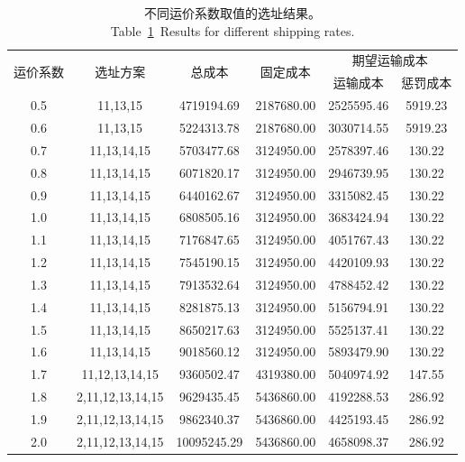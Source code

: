 \begin{table}[htbp]
    \setlength{\abovecaptionskip}{-0.05cm} %
    \setlength{\belowcaptionskip}{-0.2cm} 
    \centering
    \renewcommand\arraystretch{0.9}
    \caption{不同运价系数取值的选址结果。
    \\Table~\ref{table:sens_price}~Results for different shipping rates.}
    \small{
        \begin{tabular}{cccccc}
            \toprule %
            \multirow{2}[0]{*}{运价系数} & \multirow{2}[0]{*}{选址方案} & \multirow{2}[0]{*}{总成本} & \multirow{2}[0]{*}{固定成本} & \multicolumn{2}{c}{期望运输成本} \\
            \cmidrule{5-6}
                &       &       &       & 运输成本  & 惩罚成本 \\
            \midrule
            0.5   &  11,13,15 & 4719194.69 & 2187680.00 & 2525595.46  & 5919.23  \\
            0.6   &  11,13,15 & 5224313.78 & 2187680.00 & 3030714.55  & 5919.23  \\
            0.7   &  11,13,14,15 & 5703477.68 & 3124950.00 & 2578397.46  & 130.22  \\
            0.8   &  11,13,14,15 & 6071820.17 & 3124950.00 & 2946739.95  & 130.22  \\
            0.9   &  11,13,14,15 & 6440162.67 & 3124950.00 & 3315082.45  & 130.22  \\
            1.0   &  11,13,14,15 & 6808505.16 & 3124950.00 & 3683424.94  & 130.22  \\
            1.1   &  11,13,14,15 & 7176847.65 & 3124950.00 & 4051767.43  & 130.22  \\
            1.2   &  11,13,14,15 & 7545190.15 & 3124950.00 & 4420109.93  & 130.22  \\
            1.3   &  11,13,14,15 & 7913532.64 & 3124950.00 & 4788452.42  & 130.22  \\
            1.4   &  11,13,14,15 & 8281875.13 & 3124950.00 & 5156794.91  & 130.22  \\
            1.5   &  11,13,14,15 & 8650217.63 & 3124950.00 & 5525137.41  & 130.22  \\
            1.6   &  11,13,14,15 & 9018560.12 & 3124950.00 & 5893479.90  & 130.22  \\
            1.7   &  11,12,13,14,15 & 9360502.47 & 4319380.00 & 5040974.92  & 147.55  \\
            1.8   &  2,11,12,13,14,15 & 9629435.45 & 5436860.00 & 4192288.53  & 286.92  \\
            1.9   &  2,11,12,13,14,15 & 9862340.37 & 5436860.00 & 4425193.45  & 286.92  \\
            2.0   &  2,11,12,13,14,15 & 10095245.29 & 5436860.00 & 4658098.37  & 286.92  \\
            \bottomrule  
        \end{tabular}%
    }
    \label{table:sens_price}
\end{table}%

